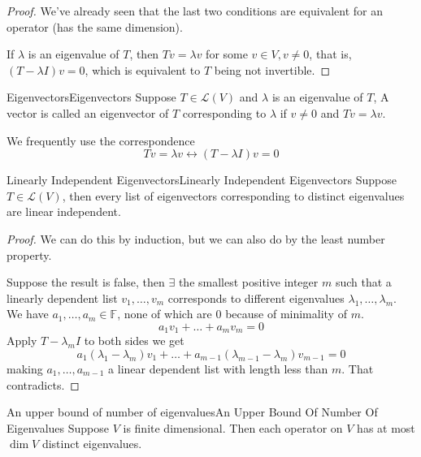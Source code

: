 \documentclass[../main.tex]{subfiles}
\begin{document}
\begin{proof}
We've already seen that the last two conditions are equivalent for an operator (has the same dimension).

If $\lambda$ is an eigenvalue of $T$, then $Tv=\lambda v$ for some $v\in V,v\neq 0$, that is, $(T-\lambda I)v=0$, which is equivalent to $T$ being not invertible.
\end{proof}


\begin{definition}{Eigenvectors}{Eigenvectors}
	Suppose $T\in \mathscr{L}(V)$ and $\lambda$ is an eigenvalue of $T$, A vector is called an eigenvector of $T$ corresponding to $\lambda$ if $v\neq 0$ and $Tv=\lambda v$.
\end{definition}

We frequently use the correspondence
\begin{equation*}
Tv= \lambda v \leftrightarrow (T-\lambda I)v=0
\end{equation*}

\begin{theorem}{Linearly Independent Eigenvectors}{Linearly Independent Eigenvectors}
Suppose $T\in \mathscr{L}(V)$, then every list of eigenvectors corresponding to distinct eigenvalues are linear independent.
\end{theorem}
\begin{proof}
We can do this by induction, but we can also do by the least number property.

Suppose the result is false, then $\exists $ the smallest positive integer $m$ such that a linearly dependent list $v_1, \ldots , v_m$ corresponds to different eigenvalues $\lambda_1, \ldots ,\lambda_m$. We have $a_1, \ldots ,a_m\in \mathbb{F}$, none of which are $0$ because of minimality of $m$.
\begin{equation*}
a_1v_1+\ldots +a_mv_m=0
\end{equation*}
Apply $T-\lambda_m I$ to both sides we get
\begin{equation*}
a_1(\lambda_1-\lambda_m)v_1+\ldots +a_{m-1}(\lambda_{m-1}-\lambda_m)v_{m-1}=0
\end{equation*}
making $a_1, \ldots ,a_{m-1}$ a linear dependent list with length less than $m$. That contradicts.
\end{proof}

\begin{corollary}{An upper bound of number of eigenvalues}{An Upper Bound Of Number Of Eigenvalues}
Suppose $V$ is finite dimensional. Then each operator on $V$ has at most $\dim V$ distinct eigenvalues.
\end{corollary}
\end{document}
